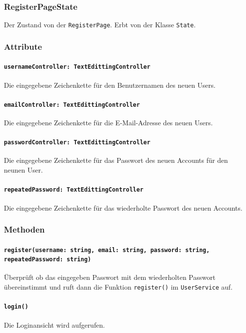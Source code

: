 \documentclass{entwurfsheft}
\begin{document}
    \subsubsection{RegisterPageState}
        Der Zustand von der \texttt{RegisterPage}. Erbt von der Klasse \texttt{State}.
        \subsubsection*{Attribute}
            \paragraph*{\texttt{usernameController: TextEdittingController}} Die eingegebene Zeichenkette für den Benutzernamen des neuen Users.
            \paragraph*{\texttt{emailController: TextEdittingController}} Die eingegebene Zeichenkette für die E-Mail-Adresse des neuen Users.
            \paragraph*{\texttt{passwordController: TextEdittingController}} Die eingegebene Zeichenkette für das Passwort des neuen Accounts für den neunen User.
            \paragraph*{\texttt{repeatedPassword: TextEdittingController}} Die eingegebene Zeichenkette für das wiederholte Passwort des neuen Accounts.
         
        \subsubsection*{Methoden}
            \paragraph*{\texttt{register(username: string, email: string, password: string, repeatedPassword: string)}} Überprüft ob das eingegeben Passwort mit dem wiederholten Passwort übereinstimmt und ruft dann die Funktion \texttt{register()} im \texttt{UserService} auf.
            \paragraph*{\texttt{login()}} Die Loginansicht wird aufgerufen.
\end{document}
